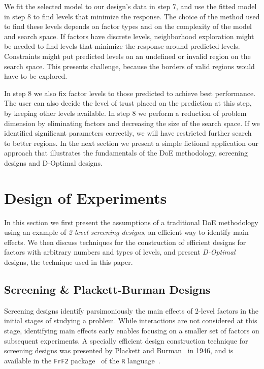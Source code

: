 \documentclass[conference]{IEEEtran}
\begin{document}
We fit  the selected model to  our design's data in  step 7, and use  the fitted
model in  step 8 to find  levels that minimize  the response. The choice  of the
method used to find  these levels depends on factor types  and on the complexity
of the  model and search  space. If  factors have discrete  levels, neighborhood
exploration might  be needed to  find levels  that minimize the  response around
predicted  levels. Constraints  might put  predicted levels  on an  undefined or
invalid region on the search space. This presents challenge, because the borders
of valid regions would have to be explored.

In  step  8 we  also  fix  factor levels  to  those  predicted to  achieve  best
performance.  The  user  can also  decide  the  level  of  trust placed  on  the
prediction at this step, by keeping other levels available. In step 8 we perform
a reduction of problem dimension by  eliminating factors and decreasing the size
of the search space. If we  identified significant parameters correctly, we will
have restricted further search to better regions. In the next section we present
a simple fictional application our approach that illustrates the fundamentals of
the DoE methodology, screening designs and D-Optimal designs.
\section{Design of Experiments}
\label{sec:orgd53cbad}
In  this  section  we  first  present  the  assumptions  of  a  traditional  DoE
methodology using an  example of \emph{2-level screening designs}, an  efficient way to
identify  main effects.  We  then  discuss techniques  for  the construction  of
efficient designs  for factors with arbitrary  numbers and types of  levels, and
present \emph{D-Optimal} designs, the technique used in this paper.
\subsection{Screening \& Plackett-Burman Designs}
\label{sec:org35859df}
Screening designs identify parsimoniously the main effects of 2-level factors in
the initial stages of studying a  problem. While interactions are not considered
at this stage, identifying main effects  early enables focusing on a smaller set
of factors on subsequent experiments.  A specially efficient design construction
technique   for    screening   designs    was   presented   by    Plackett   and
Burman~\cite{plackett1946design}  in   1946,  and  is  available   in  the  \texttt{FrF2}
package~\cite{gromping2014frf2} of the \texttt{R} language~\cite{team2018rlanguage}.
\end{document}
